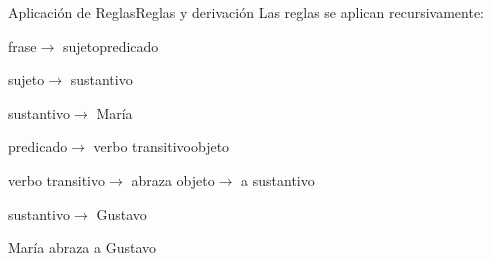 \documentclass[spanish]{beamer}
\begin{document}
\begin{frame}{Aplicación de Reglas}{Reglas y derivación}
    Las reglas se aplican recursivamente:

    \begin{longenum}
        \item \textlangle frase\textrangle $\to$ \textlangle sujeto\textrangle \textlangle predicado\textrangle

        \begin{longenum}

            \item \textlangle sujeto\textrangle $\to$ \textlangle sustantivo\textrangle

            \begin{longenum}
               \item \textlangle sustantivo\textrangle $\to$ María
            \end{longenum}

            \item \textlangle predicado\textrangle $\to$ \textlangle verbo transitivo\textrangle \textlangle objeto\textrangle
            
            \begin{longenum}
                \textlangle verbo transitivo\textrangle $\to$ \textlangle abraza\textrangle
                \textlangle objeto\textrangle $\to$ a \textlangle sustantivo\textrangle
                \begin{longenum}
                    \item \textlangle sustantivo\textrangle $\to$ Gustavo
                \end{longenum}
            \end{longenum}
        \end{longenum}
    \end{longenum}

        {\huge María abraza a Gustavo}

\end{frame}



% 
% 
\end{document}
